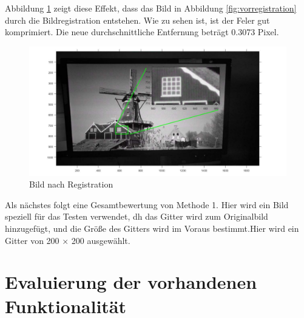 Abbildung \ref{fig:Bild nach Registration} zeigt diese Effekt, dass das Bild in Abbildung \ref{fig:vorregistration} durch die Bildregistration entstehen. Wie zu sehen ist, ist der Feler gut komprimiert. Die neue durchschnittliche Entfernung beträgt 0.3073 Pixel.
\begin{figure}[H]
 \centering 
  \includegraphics[keepaspectratio,width=1.05\textwidth]{images/5_Implementirung/nachregis.pdf}
 \caption{Bild nach Registration}
 \label{fig:Bild nach Registration}
\end{figure}

Als nächstes folgt eine Gesamtbewertung von Methode 1. Hier wird ein Bild speziell für das Testen verwendet, dh das Gitter wird zum Originalbild hinzugefügt, und die Größe des Gitters wird im Voraus bestimmt.Hier wird ein Gitter von 200 × 200 ausgewählt.


\section{Evaluierung der vorhandenen Funktionalität}